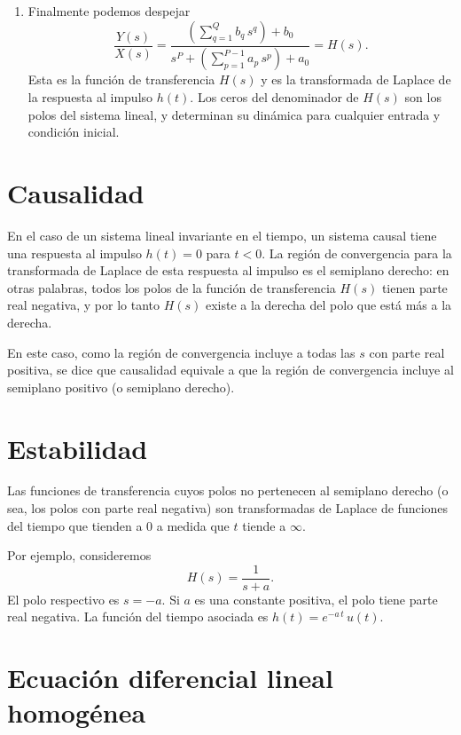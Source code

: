 \begin{enumerate}
	\item Finalmente podemos despejar
	\begin{equation}
		\frac{Y(s)}{X(s)} = \frac{\left(\sum_{q=1}^{Q}b_{q} \, s^{q}\right) + 
			b_{0}}{s^{P}  +
			\left(\sum_{p=1}^{P-1}a_{p} \, s^{p}\right) + 
			a_{0}} = H(s).
		\label{conv.difeq.5}
	\end{equation}
	Esta es la función de transferencia $H(s)$ y es la transformada de Laplace de la respuesta al impulso $h(t)$. Los ceros del denominador de $H(s)$ son los polos del sistema lineal, y determinan su dinámica para cualquier entrada y condición inicial.
\end{enumerate}

\section{Causalidad}

En el caso de un sistema lineal invariante en el tiempo, un sistema causal tiene una respuesta al impulso $h(t) = 0$ para $t < 0$. La región de convergencia para la transformada de Laplace de esta respuesta al impulso es el semiplano derecho: en otras palabras, todos los polos de la función de transferencia $H(s)$ tienen parte real negativa, y por lo tanto $H(s)$ existe a la derecha del polo que está más a la derecha.

En este caso, como la región de convergencia incluye a todas las $s$ con parte real positiva, se dice que causalidad equivale a que la región de convergencia incluye al semiplano positivo (o semiplano derecho).

\section{Estabilidad}

Las funciones de transferencia cuyos polos no pertenecen al semiplano derecho (o sea, los polos con parte real negativa) son transformadas de Laplace de funciones del tiempo que tienden a $0$ a medida que $t$ tiende a $\infty$.

Por ejemplo, consideremos
\begin{equation}
	H(s) = \frac{1}{s + a}.
\end{equation}
El polo respectivo es $s=-a$. Si $a$ es una constante positiva, el polo tiene parte real negativa. La funci\'{o}n del tiempo asociada es $h(t) = e^{-a \, t} \, u(t)$.

\section{Ecuaci\'{o}n diferencial lineal homog\'{e}nea}

